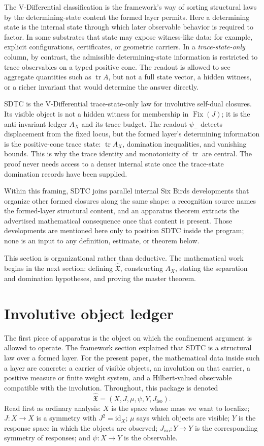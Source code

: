 \documentclass[11pt]{article}
\DeclareMathOperator{\Fix}{Fix}
\DeclareMathOperator{\trace}{tr}
\newcommand{\psim}{\psi_{-}}
\newcommand{\AX}{A_{X}}
\newcommand{\Jiso}{J_{\mathrm{iso}}}
\newcommand{\IOL}{\hat{\mathfrak{X}}}
\theoremstyle{definition}
\begin{document}
The V-Differential classification is the framework's way of sorting
structural laws by the determining-state content the formed layer
permits.  Here a determining state is the internal state through
which later observable behavior is required to factor.  In some
substrates that state may expose witness-like data: for example,
explicit configurations, certificates, or geometric carriers.  In a
\emph{trace-state-only} column, by contrast, the admissible
determining-state information is restricted to trace observables on
a typed positive cone.  The readout is allowed to see aggregate
quantities such as \(\trace A\), but not a full state vector, a
hidden witness, or a richer invariant that would determine the
answer directly.

SDTC is the V-Differential trace-state-only law for involutive
self-dual closures.  Its visible object is not a hidden witness for
membership in \(\Fix(J)\); it is the anti-invariant ledger \(\AX\)
and its trace budget.  The readout \(\psim\) detects displacement
from the fixed locus, but the formed layer's determining information
is the positive-cone trace state: \(\trace \AX\), domination
inequalities, and vanishing bounds.  This is why the trace identity
and monotonicity of \(\trace\) are central.  The proof never needs
access to a denser internal state once the trace-state domination
records have been supplied.

Within this framing, SDTC joins parallel internal Six Birds
developments that organize other formed closures along the same
shape: a recognition source names the formed-layer structural
content, and an apparatus theorem extracts the advertised
mathematical consequence once that content is present.  Those
developments are mentioned here only to position SDTC inside the
program; none is an input to any definition, estimate, or theorem
below.

This section is organizational rather than deductive.  The
mathematical work begins in the next section: defining \(\IOL\),
constructing \(\AX\), stating the separation and domination
hypotheses, and proving the master theorem.
 

\section{Involutive object ledger}
\label{sec:involutive_ledger}

The first piece of apparatus is the object on which the confinement
argument is allowed to operate.  The framework section explained
that SDTC is a structural law over a formed layer.  For the present
paper, the mathematical data inside such a layer are concrete: a
carrier of visible objects, an involution on that carrier, a
positive measure or finite weight system, and a Hilbert-valued
observable compatible with the involution.  Throughout, this package
is denoted
\[
  \IOL=(X,J,\mu,\psi,Y,\Jiso).
\]
Read first as ordinary analysis: \(X\) is the space whose mass we
want to localize; \(J:X\to X\) is a symmetry with
\(J^2=\mathrm{id}_X\); \(\mu\) says which objects are visible;
\(Y\) is the response space in which the objects are observed;
\(\Jiso:Y\to Y\) is the corresponding symmetry of responses; and
\(\psi:X\to Y\) is the observable.
\end{document}
